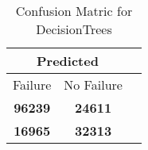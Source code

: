 \begin{table}[] 
\label{Table: Prediction Accuracy-DMDDecisionTreesOnlySunEKF-combinationReflection-Reflection} 
\caption{Confusion Matric for DecisionTrees} 
\centering 
\begin{tabular} 
 {@{}ccc@{}} 
\toprule 
\multicolumn{2}{c}{\textbf{Predicted}}
 \\ \midrule 
\multicolumn{1}{|c|}{Failure} & 
\multicolumn{1}{c|}{No Failure}
 \\ \midrule 
\multicolumn{1}{|c|}{\color{green}\textbf{96239}} & 
\multicolumn{1}{c|}{\color{red}\textbf{24611}}
 \\ \midrule 
\multicolumn{1}{|c|}{\color{red}\textbf{16965}} & 
\multicolumn{1}{c|}{\color{green}\textbf{32313}}
 \\ \bottomrule 
\end{tabular} 
\end{table} 
